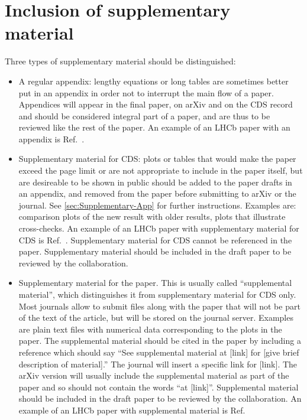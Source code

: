 \section{Inclusion of supplementary material}
\label{sec:Supplementary}

Three types of supplementary material should be distinguished:
\begin{itemize}
\item{A regular appendix: lengthy equations or long tables are sometimes
better put in an appendix in order not to interrupt the main flow of a paper.
Appendices will appear in the final paper, on arXiv
and on the CDS record and should be considered integral
part of a paper, and are thus to be reviewed like the rest of the paper.
An example of an LHCb paper with an appendix is Ref.~\cite{LHCb-PAPER-2013-070}.
}
\item{Supplementary material for CDS: plots or tables that 
would make the paper exceed the page limit or are
not appropriate to include in the paper itself,
but are desireable to be shown in public
should be added to the paper drafts in an appendix, and
removed from the paper before submitting to arXiv or the journal.
See \cref{sec:Supplementary-App} for further instructions.
Examples are: comparison plots of the new result with older results,
plots that illustrate cross-checks.
An example of an LHCb paper with supplementary material for CDS 
is Ref.~\cite{LHCb-PAPER-2013-035}.
Supplementary material for CDS cannot be referenced in the paper.
Supplementary material should be included in the draft paper to be
reviewed by the collaboration.
}
\item{Supplementary material for the paper. This is usually called ``supplemental material'', which distinguishes it from supplementary material for CDS only. Most journals allow
to submit files along with the paper that will not be part of the
text of the article, but will be stored on the journal server.
Examples are plain text files with numerical data corresponding to the plots
in the paper. 
The supplemental material should be cited in the paper by including a reference
which should say ``See supplemental material at [link] for [give brief description of material].''
The journal will insert a specific link for [link]. The arXiv version will usually include the supplemental material as part of the paper and so should not contain the words ``at [link]''.
Supplemental material should be included in the draft paper to be
reviewed by the collaboration.
An example of an LHCb paper with supplemental material 
is Ref.~\cite{LHCb-PAPER-2015-029}
}
\end{itemize}

